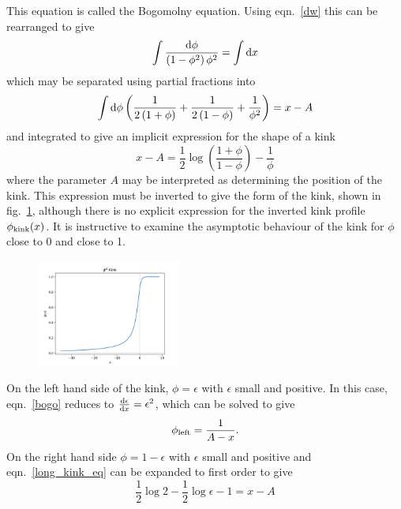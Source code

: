 \documentclass[11pt, oneside]{article}  	%
\numberwithin{equation}{section}
\newcommand{\drv}{\ensuremath{\textup{d}}}
\begin{document}
 This equation is called the Bogomolny equation. Using eqn.~\ref{dw} this can be rearranged to give
 \begin{equation}
 \int \frac{\drv\phi}{\left(1-\phi^2 \right ) \phi^2} = \int \drv x
 \end{equation}
 which may be separated using partial fractions into
 \begin{equation}
 \int\drv\phi \left (\frac{1}{2\left(1+\phi\right )} + \frac{1}{2\left(1-\phi\right )} + \frac{1}{\phi^2} \right) = x -A
 \end{equation}
 and integrated to give an implicit expression for the shape of a kink
 \begin{equation}\label{long_kink_eq}
 x-A = \frac{1}{2}\log\left (\frac{1+\phi}{1-\phi} \right ) - \frac{1}{\phi}
 \end{equation}
 where the parameter $A$ may be interpreted as determining the position of the kink. This expression must be inverted to give the form of the kink, shown in fig.~\ref{phi8kink}, although there is no explicit expression for the inverted kink profile $\phi_\textup{kink}(x)$. It is instructive to examine the asymptotic behaviour of the kink for $\phi$ close to 0 and close to 1. \par
  \begin{figure}
\centering
 \includegraphics[width=0.42\textwidth]{phi8_kink.png}
  \label{phi8kink}
\end{figure}
 On the left hand side of the kink, $\phi = \epsilon$ with $\epsilon$ small and positive. In this case, eqn.~\ref{bogo} reduces to $\frac{\drv \epsilon}{\drv x} = \epsilon^2$, which can be solved to give 
 \begin{equation}
 \phi_\textup{left} = \frac{1}{A-x}.
 \end{equation}
 On the right hand side $\phi = 1- \epsilon$ with $\epsilon$ small and positive and eqn.~\ref{long_kink_eq} can be expanded to first order to give
 \begin{equation}
 \frac{1}{2} \log2 - \frac{1}{2} \log \epsilon - 1 = x-A
 \end{equation}
\end{document}
